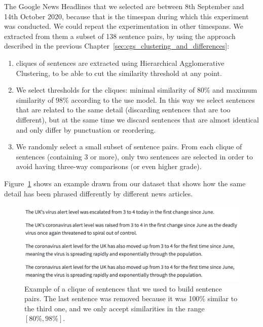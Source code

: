 The Google News Headlines that we selected are between 8th September and 14th October 2020, because that is the timespan during which this experiment was conducted. We could repeat the experimentation in other timespans.
We extracted from them a subset of 138 sentence pairs, by using the approach described in the previous Chapter~\ref{sec:cgs_clustering_and_differences}:
\begin{enumerate}
    \item cliques of sentences are extracted using Hierarchical Agglomerative Clustering, to be able to cut the similarity threshold at any point.
    \item We select thresholds for the cliques: minimal similarity of $80\%$ and maximum similarity of $98\%$ according to the \acrshort{use} model. In this way we select sentences that are related to the same detail (discarding sentences that are too different), but at the same time we discard sentences that are almost identical and only differ by punctuation or reordering.
    \item We randomly select a small subset of sentence pairs. From each clique of sentences (containing 3 or more), only two sentences are selected in order to avoid having three-way comparisons (or even higher grade).
\end{enumerate}

Figure~\ref{fig:raw_clique_data} shows an example drawn from our dataset that shows how the same detail has been phrased differently by different news articles.

\begin{figure}[!htbp]
    \centering
    \includegraphics[width=\linewidth]{figures/annotation_212_raw_with_duplicate.png}
    \caption{Example of a clique of sentences that we used to build sentence pairs. The last sentence was removed because it was 100\% similar to the third one, and we only accept similarities in the range $[80\%,98\%]$.}
    \label{fig:raw_clique_data}
\end{figure}


